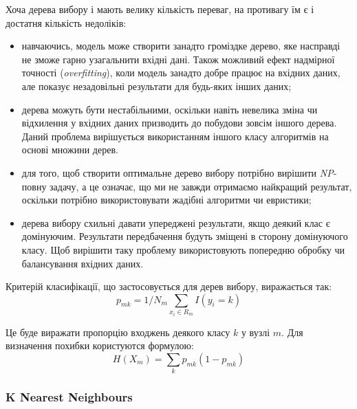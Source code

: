 Хоча дерева вибору і мають велику кількість переваг, на противагу їм є і достатня кількість недоліків:
\begin{itemize}  
	\item навчаючись, модель може створити занадто громіздке дерево, яке насправді не зможе гарно узагальнити вхідні дані. Також можливий ефект надмірної точності (\textit{overfitting}), коли модель занадто добре працює на вхідних даних, але показує незадовільні результати для будь-яких інших даних;
	\item дерева можуть бути нестабільними, оскільки навіть невелика зміна чи відхилення у вхідних даних призводить до побудови зовсім іншого дерева. Даний проблема вирішується використанням іншого класу алгоритмів на основі множини дерев.
	\item для того, щоб створити оптимальне дерево вибору потрібно вирішити \textit{NP}-повну задачу, а це означає, що ми не завжди отримаємо найкращий результат, оскільки потрібно використовувати жадібні алгоритми чи евристики;
	\item дерева вибору схильні давати упереджені результати, якщо деякий клас є домінуючим. Результати передбачення будуть зміщені в сторону домінуючого класу. Щоб вирішити таку проблему використовують попередню обробку чи балансування вхідних даних.
\end{itemize}

Критерій класифікації, що застосовується для дерев вибору, виражається так:
\begin{equation}
    \label{eq:decision_trees}
    p_{mk} = 1/N_{m}\sum_{x_{i} \in R_{m}}I(y_{i}=k)
\end{equation}

Це буде виражати пропорцію входжень деякого класу $k$ у вузлі $m$. Для визначення похибки користуются формулою:
\begin{equation}
    \label{eq:gini_norm}
    H(X_{m})=\sum_{k}p_{mk}(1-p_{mk})
\end{equation}

\subsubsection{K Nearest Neighbours}



